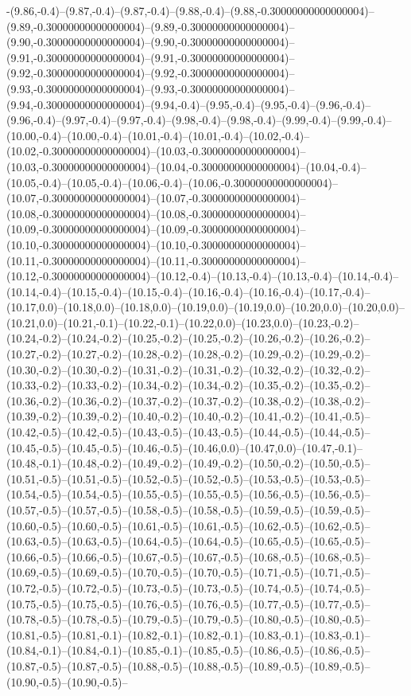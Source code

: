 -(9.86,-0.4)--(9.87,-0.4)--(9.87,-0.4)--(9.88,-0.4)--(9.88,-0.30000000000000004)--(9.89,-0.30000000000000004)--(9.89,-0.30000000000000004)--(9.90,-0.30000000000000004)--(9.90,-0.30000000000000004)--(9.91,-0.30000000000000004)--(9.91,-0.30000000000000004)--(9.92,-0.30000000000000004)--(9.92,-0.30000000000000004)--(9.93,-0.30000000000000004)--(9.93,-0.30000000000000004)--(9.94,-0.30000000000000004)--(9.94,-0.4)--(9.95,-0.4)--(9.95,-0.4)--(9.96,-0.4)--(9.96,-0.4)--(9.97,-0.4)--(9.97,-0.4)--(9.98,-0.4)--(9.98,-0.4)--(9.99,-0.4)--(9.99,-0.4)--(10.00,-0.4)--(10.00,-0.4)--(10.01,-0.4)--(10.01,-0.4)--(10.02,-0.4)--(10.02,-0.30000000000000004)--(10.03,-0.30000000000000004)--(10.03,-0.30000000000000004)--(10.04,-0.30000000000000004)--(10.04,-0.4)--(10.05,-0.4)--(10.05,-0.4)--(10.06,-0.4)--(10.06,-0.30000000000000004)--(10.07,-0.30000000000000004)--(10.07,-0.30000000000000004)--(10.08,-0.30000000000000004)--(10.08,-0.30000000000000004)--(10.09,-0.30000000000000004)--(10.09,-0.30000000000000004)--(10.10,-0.30000000000000004)--(10.10,-0.30000000000000004)--(10.11,-0.30000000000000004)--(10.11,-0.30000000000000004)--(10.12,-0.30000000000000004)--(10.12,-0.4)--(10.13,-0.4)--(10.13,-0.4)--(10.14,-0.4)--(10.14,-0.4)--(10.15,-0.4)--(10.15,-0.4)--(10.16,-0.4)--(10.16,-0.4)--(10.17,-0.4)--(10.17,0.0)--(10.18,0.0)--(10.18,0.0)--(10.19,0.0)--(10.19,0.0)--(10.20,0.0)--(10.20,0.0)--(10.21,0.0)--(10.21,-0.1)--(10.22,-0.1)--(10.22,0.0)--(10.23,0.0)--(10.23,-0.2)--(10.24,-0.2)--(10.24,-0.2)--(10.25,-0.2)--(10.25,-0.2)--(10.26,-0.2)--(10.26,-0.2)--(10.27,-0.2)--(10.27,-0.2)--(10.28,-0.2)--(10.28,-0.2)--(10.29,-0.2)--(10.29,-0.2)--(10.30,-0.2)--(10.30,-0.2)--(10.31,-0.2)--(10.31,-0.2)--(10.32,-0.2)--(10.32,-0.2)--(10.33,-0.2)--(10.33,-0.2)--(10.34,-0.2)--(10.34,-0.2)--(10.35,-0.2)--(10.35,-0.2)--(10.36,-0.2)--(10.36,-0.2)--(10.37,-0.2)--(10.37,-0.2)--(10.38,-0.2)--(10.38,-0.2)--(10.39,-0.2)--(10.39,-0.2)--(10.40,-0.2)--(10.40,-0.2)--(10.41,-0.2)--(10.41,-0.5)--(10.42,-0.5)--(10.42,-0.5)--(10.43,-0.5)--(10.43,-0.5)--(10.44,-0.5)--(10.44,-0.5)--(10.45,-0.5)--(10.45,-0.5)--(10.46,-0.5)--(10.46,0.0)--(10.47,0.0)--(10.47,-0.1)--(10.48,-0.1)--(10.48,-0.2)--(10.49,-0.2)--(10.49,-0.2)--(10.50,-0.2)--(10.50,-0.5)--(10.51,-0.5)--(10.51,-0.5)--(10.52,-0.5)--(10.52,-0.5)--(10.53,-0.5)--(10.53,-0.5)--(10.54,-0.5)--(10.54,-0.5)--(10.55,-0.5)--(10.55,-0.5)--(10.56,-0.5)--(10.56,-0.5)--(10.57,-0.5)--(10.57,-0.5)--(10.58,-0.5)--(10.58,-0.5)--(10.59,-0.5)--(10.59,-0.5)--(10.60,-0.5)--(10.60,-0.5)--(10.61,-0.5)--(10.61,-0.5)--(10.62,-0.5)--(10.62,-0.5)--(10.63,-0.5)--(10.63,-0.5)--(10.64,-0.5)--(10.64,-0.5)--(10.65,-0.5)--(10.65,-0.5)--(10.66,-0.5)--(10.66,-0.5)--(10.67,-0.5)--(10.67,-0.5)--(10.68,-0.5)--(10.68,-0.5)--(10.69,-0.5)--(10.69,-0.5)--(10.70,-0.5)--(10.70,-0.5)--(10.71,-0.5)--(10.71,-0.5)--(10.72,-0.5)--(10.72,-0.5)--(10.73,-0.5)--(10.73,-0.5)--(10.74,-0.5)--(10.74,-0.5)--(10.75,-0.5)--(10.75,-0.5)--(10.76,-0.5)--(10.76,-0.5)--(10.77,-0.5)--(10.77,-0.5)--(10.78,-0.5)--(10.78,-0.5)--(10.79,-0.5)--(10.79,-0.5)--(10.80,-0.5)--(10.80,-0.5)--(10.81,-0.5)--(10.81,-0.1)--(10.82,-0.1)--(10.82,-0.1)--(10.83,-0.1)--(10.83,-0.1)--(10.84,-0.1)--(10.84,-0.1)--(10.85,-0.1)--(10.85,-0.5)--(10.86,-0.5)--(10.86,-0.5)--(10.87,-0.5)--(10.87,-0.5)--(10.88,-0.5)--(10.88,-0.5)--(10.89,-0.5)--(10.89,-0.5)--(10.90,-0.5)--(10.90,-0.5)--